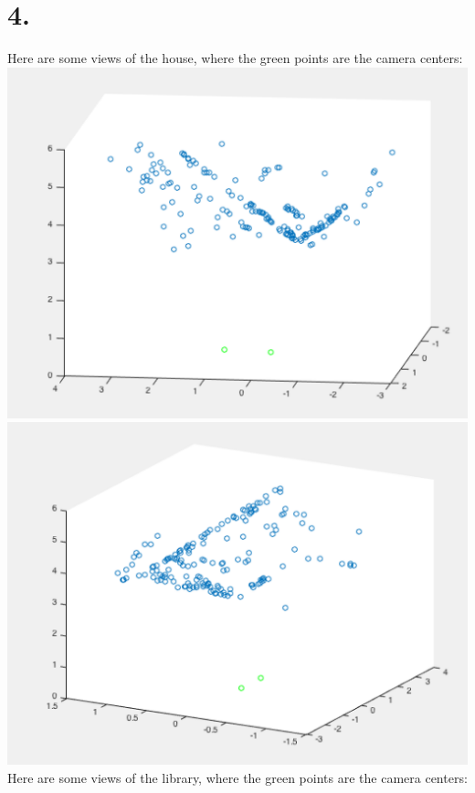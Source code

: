 \documentclass[11pt]{article}
\begin{document}
\section*{4.}Here are some views of the house, where the green points are the camera centers:\\
\includegraphics[scale=0.40]{house1.png} \includegraphics[scale=0.40]{house2.png}\\
Here are some views of the library, where the green points are the camera centers:\\
\end{document}

